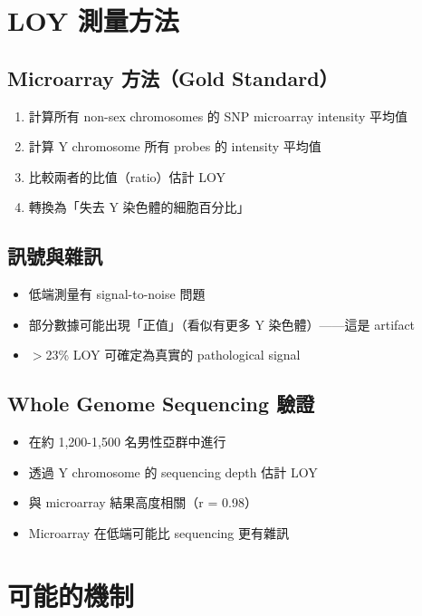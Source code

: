 \documentclass[12pt,a4paper]{article}
\begin{document}
\section{LOY 測量方法}

\subsection{Microarray 方法（Gold Standard）}

\begin{enumerate}
    \item 計算所有 non-sex chromosomes 的 SNP microarray intensity 平均值
    \item 計算 Y chromosome 所有 probes 的 intensity 平均值
    \item 比較兩者的比值（ratio）估計 LOY
    \item 轉換為「失去 Y 染色體的細胞百分比」
\end{enumerate}

\subsection{訊號與雜訊}

\begin{itemize}
    \item 低端測量有 signal-to-noise 問題
    \item 部分數據可能出現「正值」（看似有更多 Y 染色體）——這是 artifact
    \item $>$23\% LOY 可確定為真實的 pathological signal
\end{itemize}

\subsection{Whole Genome Sequencing 驗證}

\begin{itemize}
    \item 在約 1,200-1,500 名男性亞群中進行
    \item 透過 Y chromosome 的 sequencing depth 估計 LOY
    \item 與 microarray 結果高度相關（r = 0.98）
    \item Microarray 在低端可能比 sequencing 更有雜訊
\end{itemize}

\section{可能的機制}
\end{document}
